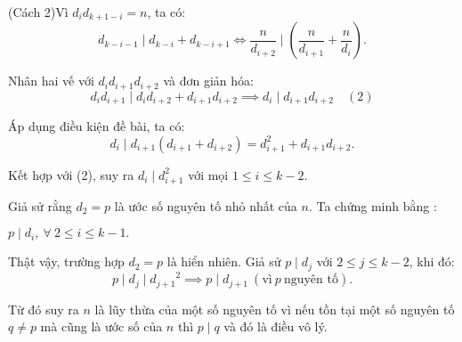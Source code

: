 \documentclass[../01-divisibility.tex]{subfiles}
\begin{document}
\begin{soln}(Cách 2)\footnotemark[\value{footnote}]
    Vì \( d_i d_{k+1-i} = n \), ta có:
    \[
        d_{k-i-1} \mid d_{k-i} + d_{k-i+1} \Longleftrightarrow \frac{n}{d_{i+2}} \mid \left( \frac{n}{d_{i+1}} + \frac{n}{d_i} \right).
    \]

    Nhân hai vế với \( d_i d_{i+1} d_{i+2} \) và đơn giản hóa:
    \[
        d_i d_{i+1} \mid d_i d_{i+2} + d_{i+1} d_{i+2} \implies d_i \mid d_{i+1} d_{i+2} \quad (2)
    \]
    
    Áp dụng điều kiện đề bài, ta có:
    \[
        d_i \mid d_{i+1} (d_{i+1} + d_{i+2}) = d_{i+1}^2 + d_{i+1} d_{i+2}.
    \]
    
    Kết hợp với (2), suy ra \( d_i \mid d_{i+1}^2 \) với mọi \( 1 \leq i \leq k - 2 \).
    
    Giả sử rằng \( d_2 = p \) là ước số nguyên tố nhỏ nhất của \( n \). Ta chứng minh bằng :
    \begin{claim*}
        $p \mid d_i,\ \forall\ 2 \leq i \leq k - 1.$
    \end{claim*}
    \begin{subproof}
        Thật vậy, trường hợp $d_2 = p$ là hiển nhiên. Giả sử $p \mid d_j$ với $2 \le j \le k-2$, khi đó:
        \[
            p \mid d_j \mid {d_{j+1}}^2 \implies p \mid d_{j+1}\ (\text{vì}\ p\ \text{nguyên tố}). 
        \]
    \end{subproof}

    Từ đó suy ra \( n \) là lũy thừa của một số nguyên tố vì nếu tồn tại một số nguyên tố $q \ne p$ mà cũng là ước số của $n$ thì $p\mid q$ và đó là điều vô lý.
\end{soln}

\bigbreak
\end{document}
